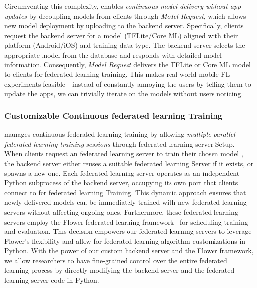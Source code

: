 Circumventing this complexity,
\fedkit enables \textit{continuous model delivery without app updates} by
decoupling models from clients through \textit{Model Request},
which allows new model deployment by uploading to the backend server.
Specifically, clients request the backend server for a model (TFLite/Core ML)
aligned with
their platform (Android/iOS) and training data type.
The backend server selects the appropriate model \model{} from the database and
responds with detailed model information.
Consequently, \textit{Model Request} delivers the TFLite or Core ML model
to clients for federated learning training.
This makes real-world mobile FL experiments feasible---instead of constantly
annoying the users by telling them to update the apps,
we can trivially iterate on the models without users noticing.

\subsubsection{Customizable Continuous federated learning Training}
\fedkit manages continuous federated learning training by allowing
\textit{multiple parallel federated learning training sessions}
through federated learning server Setup. When clients request an federated
learning server to train their chosen model \model{},
the backend server either reuses a suitable federated learning Server \fs{}
if it exists, or spawns a new one.
Each federated learning server operates as an independent Python subprocess of
the backend server,
occupying its own port that clients connect to for federated learning Training.
This dynamic approach ensures that newly delivered models can be immediately
trained with new federated learning servers without affecting ongoing ones.
Furthermore,
these federated learning servers employ the Flower federated learning
framework~\cite{beutel2020flower} for scheduling training and evaluation.
This decision empowers our federated learning servers to leverage Flower's
flexibility and allow for federated learning algorithm customizations in Python.
With the power of our custom backend server and the Flower framework,
we allow researchers to have fine-grained control over the entire federated
learning process by directly modifying the backend server and the federated
learning server code in Python.
